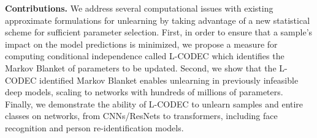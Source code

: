 \noindent\textbf{Contributions.} We address several computational issues with existing approximate formulations for unlearning by taking advantage of a new statistical scheme for sufficient parameter selection. 
First, in order to ensure that a sample's impact on the model predictions is minimized, we propose a measure for computing conditional independence called L-CODEC which  identifies the Markov Blanket of parameters to be  updated. 
Second, we show that the L-CODEC identified Markov Blanket enables unlearning in previously infeasible deep models, scaling to networks with hundreds of millions of parameters. 
Finally, we demonstrate the ability of L-CODEC to unlearn samples and entire classes on networks, from CNNs/ResNets to transformers, including face recognition and person re-identification models.



